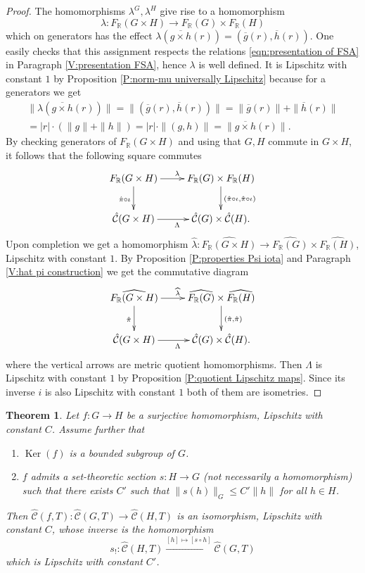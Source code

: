 \documentclass[12pt]{amsart}
\newtheorem{theorem}[prop]{Theorem}
\theoremstyle{definition}
\def\RR{\ensuremath{\mathbb{R}}}
\newcommand{\xto}[1]{\xrightarrow{#1}}
\newcommand{\OP}[1]{\operatorname{#1}}
\def\Free{F}
\def\tC{\hat{\mathcal{C}}}
\begin{document}
\begin{proof}
The homomorphisms $\lambda^G, \lambda^H$ give rise to a homomorphism
\[
\lambda \colon \Free_\RR(G \times H) \to \Free_\RR(G) \times \Free_\RR(H)
\]
which on generators has the effect $\lambda(\overline{g \times h}(r)) = (\overline{g}(r),\overline{h}(r))$.
One easily checks that this assignment respects the relations \eqref{eqn:presentation of FSA} in Paragraph \ref{V:presentation FSA}, hence $\lambda$ is well defined.
It is Lipschitz with constant $1$ by Proposition \ref{P:norm-mu universally Lipschitz} because for a generators we get
\begin{multline*}
\| \lambda(\overline{g \times h}(r))\| = \|(\overline{g}(r),\overline{h}(r))\| = \| \overline{g}(r)\|+\|\overline{h}(r)\| 
\\
=
|r| \cdot (\|g\|+\|h\|) = |r| \cdot \|(g,h)\| = \| \overline{g \times h}(r)\|.
\end{multline*}
By checking generators of $\Free_\RR(G \times H)$ and using that $G,H$ commute in $G \times H$, it follows that the following square commutes
\[
\xymatrix{
\Free_\RR(G \times H) \ar[r]^{\lambda} \ar[d]_{\hat{\pi} \circ \iota} &
\Free_\RR(G) \times \Free_\RR(H) \ar[d]^{(\hat{\pi} \circ \iota, \hat{\pi} \circ \iota)}
\\
\tC(G \times H) \ar[r]_\Lambda & 
\tC(G) \times \tC(H).
}
\]
Upon completion we get a homomorphism $\widehat{\lambda} \colon \widehat{\Free_\RR(G \times H)} \to \widehat{\Free_\RR(G)} \times \widehat{\Free_\RR(H)}$, Lipschitz with constant $1$.
By Proposition \ref{P:properties Psi iota} and Paragraph \ref{V:hat pi construction} we get the commutative diagram
\[
\xymatrix{
\widehat{\Free_\RR(G \times H)} \ar[r]^{\widehat{\lambda}} \ar[d]_{\hat{\pi}} &
\widehat{\Free_\RR(G)} \times \widehat{\Free_\RR(H)} \ar[d]^{(\hat{\pi}, \hat{\pi})}
\\
\tC(G \times H) \ar[r]_\Lambda & 
\tC(G) \times \tC(H).
}
\]
where the vertical arrows are metric quotient homomorphisms.
Then $\Lambda$ is Lipschitz with constant $1$ by Proposition \ref{P:quotient Lipschitz maps}.
Since its inverse $i$ is also Lipschitz with constant $1$ both of them are isometries.
\end{proof}








\begin{theorem}\label{T:tC quotient with section}
Let $f \colon G \to H$ be a surjective homomorphism, Lipschitz with constant $C$.
Assume further that
\begin{enumerate}[label=(\alph*)]
\item
$\OP{Ker}(f)$ is a bounded subgroup of $G$.
\item
$f$ admits a set-theoretic section $s \colon H \to G$ (not necessarily a homomorphism) such that there exists $C'$ such that $\|s(h)\|_G \leq C' \|h\|$ for all $h \in H$.
\end{enumerate}
Then $\tC(f,T) \colon \tC(G,T) \to \tC(H,T)$ is an isomorphism, Lipschitz with constant $C$, whose inverse is the homomorphism
\[
s_! \colon \tC(H,T) \xto{ [h] \mapsto [s \circ h] } \tC(G,T)
\]
which is Lipschitz with constant $C'$.
\end{theorem}
\end{document}
